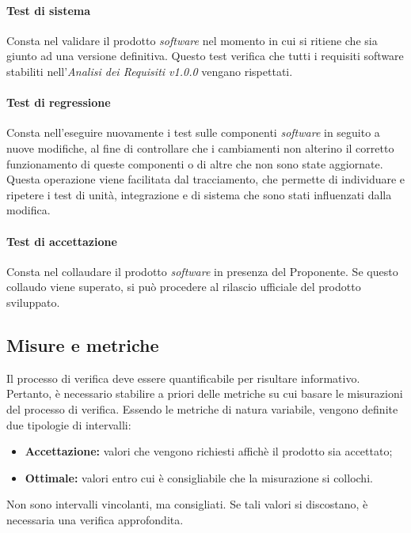 \paragraph{Test di sistema}

Consta nel validare il prodotto \textit{software} nel momento in cui si ritiene che sia 
giunto ad una versione definitiva. Questo test verifica che tutti i requisiti 
software stabiliti nell'\textit{Analisi dei Requisiti v1.0.0} vengano 
rispettati.

\paragraph{Test di regressione}

Consta nell'eseguire nuovamente i test sulle componenti \textit{software} in seguito a nuove modifiche, al fine di controllare che i cambiamenti non alterino il 
corretto funzionamento di queste componenti o di altre che non sono state 
aggiornate.
Questa operazione viene facilitata dal tracciamento, che permette di individuare e ripetere i test di unità, integrazione e di sistema che sono stati influenzati dalla modifica.

\paragraph{Test di accettazione}

Consta nel collaudare il prodotto \textit{software} in presenza del Proponente. Se questo collaudo viene superato, si può procedere al rilascio ufficiale del prodotto sviluppato.

\subsection{Misure e metriche}
\label{cap:sezione 2.9 Misure e metriche}

Il processo di verifica deve essere quantificabile per risultare informativo. Pertanto, è necessario stabilire a priori delle metriche su cui basare le misurazioni del processo di verifica. Essendo le metriche di natura variabile, vengono definite due tipologie di intervalli:
\begin{itemize}
	\item \textbf{Accettazione:} valori che vengono richiesti affichè il prodotto sia accettato;
	\item \textbf{Ottimale:} valori entro cui è consigliabile che la 
	misurazione si collochi.
\end{itemize}
Non sono intervalli vincolanti, ma consigliati. Se 
tali valori si discostano, è necessaria una verifica approfondita.

